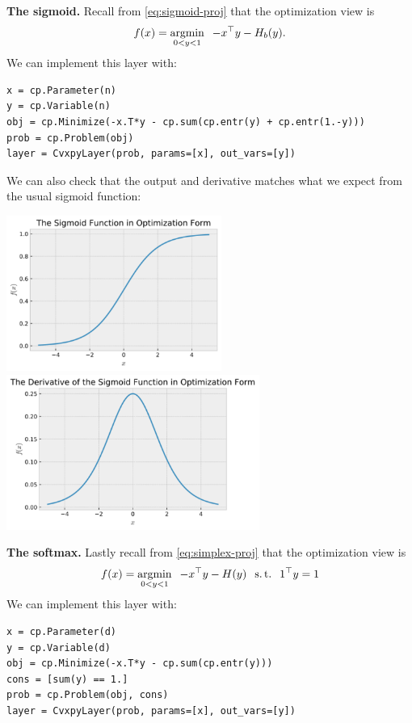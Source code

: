\newpage
\textbf{The sigmoid.}
Recall from \cref{eq:sigmoid-proj} that the optimization view is
\begin{equation*}
f(x) = \operatorname*{argmin}_{0<y<1} \;\; -x^\top y -H_b(y).
\end{equation*}
We can implement this layer with:
\begin{lstlisting}
x = cp.Parameter(n)
y = cp.Variable(n)
obj = cp.Minimize(-x.T*y - cp.sum(cp.entr(y) + cp.entr(1.-y)))
prob = cp.Problem(obj)
layer = CvxpyLayer(prob, params=[x], out_vars=[y])
\end{lstlisting}
We can also check that the output and derivative matches
what we expect from the usual sigmoid function:

\includegraphics[height=2in]{fs/output_6.pdf}
\includegraphics[height=2in]{fs/output_7.pdf}

\textbf{The softmax.}
Lastly recall from \cref{eq:simplex-proj} that the optimization view is
\begin{equation*}
f(x) = \operatorname*{argmin}_{0<y<1} \;\; -x^\top y - H(y) \;\; \operatorname*{s.t.}\;\; 1^\top y = 1
\end{equation*}
We can implement this layer with:
\begin{lstlisting}
x = cp.Parameter(d)
y = cp.Variable(d)
obj = cp.Minimize(-x.T*y - cp.sum(cp.entr(y)))
cons = [sum(y) == 1.]
prob = cp.Problem(obj, cons)
layer = CvxpyLayer(prob, params=[x], out_vars=[y])
\end{lstlisting}

\newpage
